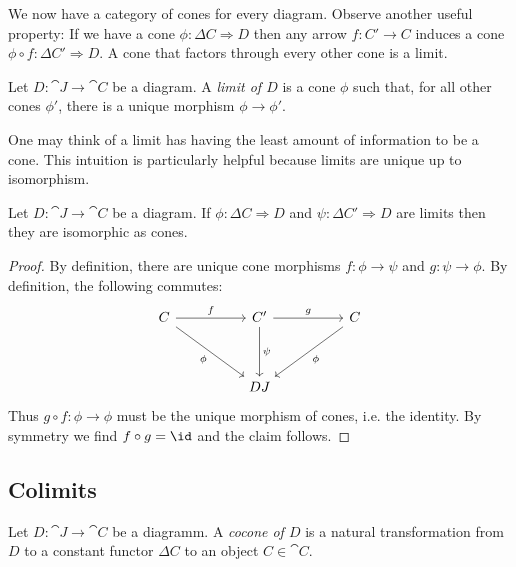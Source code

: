 \documentclass{article}
\begin{document}
We now have a category of cones for every diagram.
Observe another useful property: If we have a cone $\phi:\Delta C\Rightarrow D$
then any arrow $f:C'\to C$ induces a cone $\phi\circ f:\Delta C'\Rightarrow D$.
A cone that factors through every other cone is a limit.

\begin{definition}
  Let $D:\cat{J}\to\cat{C}$ be a diagram. A \emph{limit of $D$} is a cone
  $\phi$ such that, for all other cones $\phi'$, there is a unique morphism
  $\phi\to\phi'$.
\end{definition}

One may think of a limit has having the least amount of information to be a cone.
This intuition is particularly helpful because limits are unique up to isomorphism.

\begin{proposition}
  Let $D:\cat{J}\to\cat{C}$ be a diagram. If $\phi:\Delta C\Rightarrow D$
  and $\psi:\Delta C'\Rightarrow D$ are limits then they are isomorphic as cones.
  \begin{proof}
    By definition, there are unique cone morphisms $f:\phi\to\psi$ and
    $g:\psi\to\phi$. By definition, the following commutes:
    \begin{equation}
      \begin{tikzcd}
        C && {C'} && C \\
        \\
          && DJ
          \arrow["f", from=1-1, to=1-3]
          \arrow["\psi", from=1-3, to=3-3]
          \arrow["\phi"', from=1-1, to=3-3]
          \arrow["\phi", from=1-5, to=3-3]
          \arrow["g", from=1-3, to=1-5]
      \end{tikzcd}
    \end{equation}
    Thus $g\circ f:\phi\to\phi$ must be the unique morphism of cones, i.e.
    the identity. By symmetry we find $f\circ g=\id$ and the claim follows.
  \end{proof}
\end{proposition}

\subsection{Colimits}

\begin{definition}
  Let $D:\cat{J}\to\cat{C}$ be a diagramm. A \emph{cocone of $D$} is a
  natural transformation from $D$ to a constant functor $\Delta C$
  to an object $C\in\cat{C}$.
\end{definition}
\end{document}
